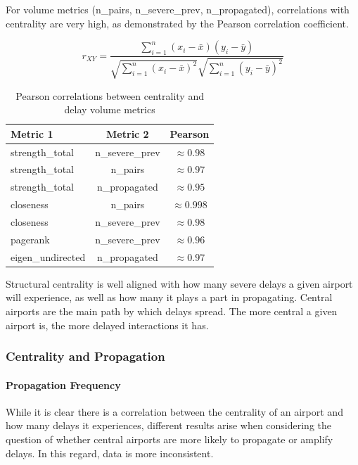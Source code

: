 \documentclass[9pt]{article}
\begin{document}
For volume metrics (n\_pairs, n\_severe\_prev, n\_propagated), correlations with centrality are very high, as demonstrated by the Pearson correlation coefficient.

\[
r_{XY}
=
\frac{\displaystyle\sum_{i=1}^{n} (x_i - \bar{x})(y_i - \bar{y})}
     {\sqrt{\displaystyle\sum_{i=1}^{n} (x_i - \bar{x})^2}
      \sqrt{\displaystyle\sum_{i=1}^{n} (y_i - \bar{y})^2}}
\]

\begin{table}[h!]
    \centering 
    \caption{Pearson correlations between centrality and delay volume metrics}
    \begin{tabular}{lcc}
        \toprule
        Metric 1 & Metric 2 & Pearson \\
        \midrule
        strength\_total & n\_severe\_prev & $\approx 0.98$ \\
        strength\_total & n\_pairs        & $\approx 0.97$ \\
        strength\_total & n\_propagated   & $\approx 0.95$ \\
        closeness       & n\_pairs        & $\approx 0.998$ \\
        closeness       & n\_severe\_prev & $\approx 0.98$ \\
        pagerank        & n\_severe\_prev & $\approx 0.96$ \\
        eigen\_undirected & n\_propagated & $\approx 0.97$ \\
        \bottomrule
    \end{tabular}
\end{table}

Structural centrality is well aligned with how many severe delays a given airport will experience, as well as how many it plays a part in propagating. Central airports are the main path by which delays spread. The more central a given airport is, the more delayed interactions it has.

\subsubsection{Centrality and Propagation}

\paragraph{Propagation Frequency}
While it is clear there is a correlation between the centrality of an airport and how many delays it experiences, different results arise when considering the question of whether central airports are more likely to propagate or amplify delays. In this regard, data is more inconsistent.
\end{document}
